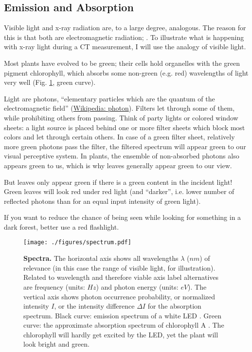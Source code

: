 \subsection{Emission and Absorption}
\label{sec:orgdefa38f}
Visible light and x-ray radiation are, to a large degree, analogous.
The reason for this is that both are electromagnetic radiation; .
To illustrate what is happening with x-ray light during a CT measurement, I will use the analogy of visible light.



Most plants have evolved to be green; their cells hold organelles with the green pigment chlorophyll, which absorbs some non-green (e.g. red) wavelengths of light very well (Fig. \ref{fig:spectrum}, green curve).
\begin{change}
Light are photons, ``elementary particles which are the quantum of the electromagnetic field'' (\href{https://en.wikipedia.org/wiki/Photon}{Wikipedia: photon}).
Filters let through some of them, while prohibiting others from passing.
Think of party lights or colored window sheets: a light source is placed behind one or more filter sheets which block most colors and let through certain others.
In case of a green filter sheet, relatively more green photons pass the filter, the filtered spectrum will appear green to our visual perceptive system.
In plants, the ensemble of non-absorbed photons also appears green to us, which is why leaves generally appear green to our view.
\end{change}
But leaves only appear green if there is a green content in the incident light!
Green leaves will look red under red light (and ``darker'', i.e. lower number of reflected photons than for an equal input intensity of green light).
\begin{change}
If you want to reduce the chance of being seen while looking for something in a dark forest, better use a red flashlight.
\end{change}


\begin{figure}[p]
\centering
\texttt{[image: ./figures/spectrum.pdf]}
\caption{\label{fig:spectrum}\textbf{Spectra.} The horizontal axis shows all wavelengths \(\lambda\) (\(nm\)) of relevance (in this case the range of visible light, for illustration). Related to wavelength and therefore viable axis label alternatives are frequency (units: \(Hz\)) and photon energy (units: \(eV\)). The vertical axis shows photon occurrence probability, or normalized intensity \(I\), or the intensity difference \(\Delta I\) for the absorption spectrum. Black curve: emission spectrum of a white LED \citep{Tanabe2005}. Green curve: the approximate absorption spectrum of chlorophyll A \citep{Zscheile1934}. The chlorophyll will hardly get excited by the LED, yet the plant will look bright and green.}
\end{figure}


